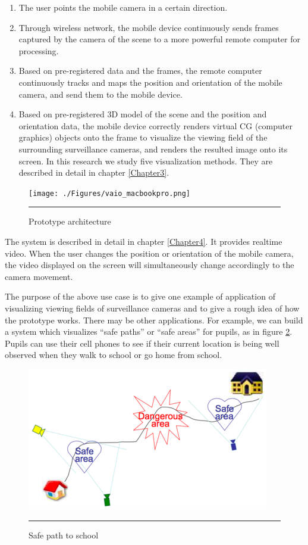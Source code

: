 \begin{enumerate}
	\item The user points the mobile camera in a certain direction.
	\item Through wireless network, the mobile device continuously sends frames captured by the camera of the scene to a more powerful remote computer for processing.
	\item Based on pre-registered data and the frames, the remote computer continuously tracks and maps the position and orientation of the mobile camera, and send them to the mobile device.
	\item Based on pre-registered 3D model of the scene and the position and orientation data, the mobile device correctly renders virtual CG (computer graphics) objects onto the frame to visualize the viewing field of the surrounding surveillance cameras, and renders the resulted image onto its screen. In this research we study five visualization methods. They are described in detail in chapter \ref{Chapter3}.
\end{enumerate}

\begin{figure}[htbp]
	\centering
	\texttt{[image: ./Figures/vaio\_macbookpro.png]}
	\rule{35em}{0.5pt}
	\caption[Prototype architecture]{Prototype architecture}
	\label{fig:VAIOMacBookPro}
\end{figure}

The system is described in detail in chapter \ref{Chapter4}. It provides realtime video. When the user changes the position or orientation of the mobile camera, the video displayed on the screen will simultaneously change accordingly to the camera movement.

The purpose of the above use case is to give one example of application of visualizing viewing fields of surveillance cameras and to give a rough idea of how the prototype works. There may be other applications. For example, we can build a system which visualizes ``safe paths'' or ``safe areas'' for pupils, as in figure \ref{fig:HomeSchool}. Pupils can use their cell phones to see if their current location is being well observed when they walk to school or go home from school.

\begin{figure}[htbp]
	\centering
	\includegraphics{./Primitives/home_school.png}
	\rule{35em}{0.5pt}
	\caption[Safe path to school]{Safe path to school}
	\label{fig:HomeSchool}
\end{figure}
